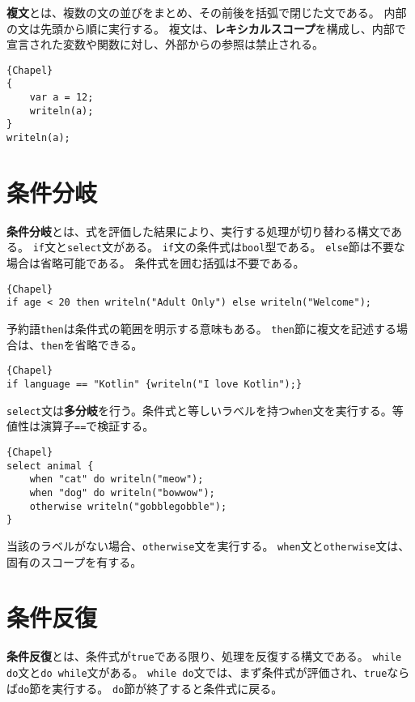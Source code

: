 \documentclass[10pt,a4paper]{book}
\begin{document}
\textbf{複文}とは、複数の文の並びをまとめ、その前後を括弧で閉じた文である。
内部の文は先頭から順に実行する。
複文は、\textbf{レキシカルスコープ}を構成し、内部で宣言された変数や関数に対し、外部からの参照は禁止される。

\begin{Verbatim}{Chapel}
{
	var a = 12;
	writeln(a);
}
writeln(a);
\end{Verbatim}

\section{条件分岐}

\textbf{条件分岐}とは、式を評価した結果により、実行する処理が切り替わる構文である。
\verb#if#文と\verb#select#文がある。
\verb#if#文の条件式は\verb#bool#型である。
\verb#else#節は不要な場合は省略可能である。
条件式を囲む括弧は不要である。

\begin{Verbatim}{Chapel}
if age < 20 then writeln("Adult Only") else writeln("Welcome");
\end{Verbatim}

予約語\verb#then#は条件式の範囲を明示する意味もある。
\verb#then#節に複文を記述する場合は、\verb#then#を省略できる。

\begin{Verbatim}{Chapel}
if language == "Kotlin" {writeln("I love Kotlin");}
\end{Verbatim}

\verb#select#文は\textbf{多分岐}を行う。条件式と等しいラベルを持つ\verb#when#文を実行する。等値性は演算子\verb#==#で検証する。

\begin{Verbatim}{Chapel}
select animal {
	when "cat" do writeln("meow");
	when "dog" do writeln("bowwow");
	otherwise writeln("gobblegobble");
}
\end{Verbatim}

当該のラベルがない場合、\verb#otherwise#文を実行する。
\verb#when#文と\verb#otherwise#文は、固有のスコープを有する。

\section{条件反復}

\textbf{条件反復}とは、条件式が\verb#true#である限り、処理を反復する構文である。
\verb#while do#文と\verb#do while#文がある。
\verb#while do#文では、まず条件式が評価され、\verb#true#ならば\verb#do#節を実行する。
\verb#do#節が終了すると条件式に戻る。
\end{document}

